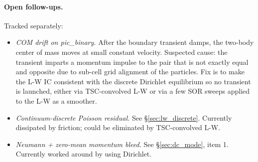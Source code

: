 \documentclass[11pt,a4paper]{article}
\begin{document}
\paragraph{Open follow-ups.}  Tracked separately:
\begin{itemize}[leftmargin=*,nosep]
  \item \emph{COM drift on pic\_binary.}  After the boundary transient
    damps, the two-body center of mass moves at small constant
    velocity.  Suspected cause: the transient imparts a momentum
    impulse to the pair that is not exactly equal and opposite due
    to sub-cell grid alignment of the particles.  Fix is to make the
    L-W IC consistent with the discrete Dirichlet equilibrium so no
    transient is launched, either via TSC-convolved L-W or via a few
    SOR sweeps applied to the L-W as a smoother.
  \item \emph{Continuum-discrete Poisson residual.}  See
    \S\ref{sec:lw_discrete}.  Currently dissipated by friction; could
    be eliminated by TSC-convolved L-W.
  \item \emph{Neumann + zero-mean momentum bleed.}  See
    \S\ref{sec:dc_mode}, item 1.  Currently worked around by using
    Dirichlet.
\end{itemize}
\end{document}
